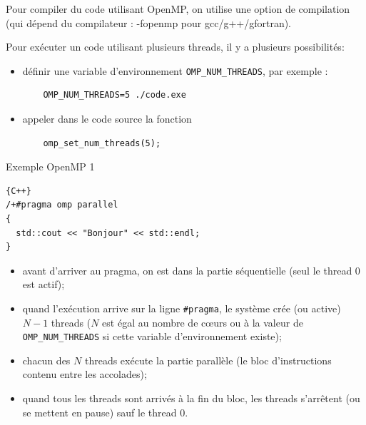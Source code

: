 \documentclass{beamer}
\begin{document}
\begin{frame}[fragile]

Pour compiler du code utilisant OpenMP, on utilise une option de compilation (qui dépend du compilateur : -fopenmp pour gcc/g++/gfortran).

\vfill
Pour exécuter un code utilisant plusieurs threads, il y a plusieurs possibilités:
\begin{itemize}
	\item définir une variable d'environnement \verb|OMP_NUM_THREADS|, par exemple :
	\begin{lstlisting}
	OMP_NUM_THREADS=5 ./code.exe
	\end{lstlisting}
	\item appeler dans le code source la fonction
	\begin{lstlisting}
	omp_set_num_threads(5);
	\end{lstlisting}
\end{itemize}
\vfill
\end{frame}

\begin{frame}
	Exemple OpenMP 1
\end{frame}

\begin{frame}[fragile]
	
	\begin{lstlisting}{C++}
/+#pragma omp parallel
{
  std::cout << "Bonjour" << std::endl;
}
\end{lstlisting}

\vfill
\begin{itemize}
	\item avant d'arriver au pragma, on est dans la partie séquentielle (seul le thread 0 est actif); 
	\item quand l'exécution arrive sur la ligne \verb|#pragma|, le système crée (ou active) $N-1$ threads ($N$ est égal au nombre de c\oe urs ou à la valeur de \verb|OMP_NUM_THREADS| si cette variable d'environnement existe);
	\item chacun des $N$ threads exécute la partie parallèle (le bloc d'instructions contenu entre les accolades);
	\item quand tous les threads sont arrivés à la fin du bloc, les threads s'arrêtent (ou se mettent en pause) sauf le thread 0.
\end{itemize}

\end{frame}
\end{document}
